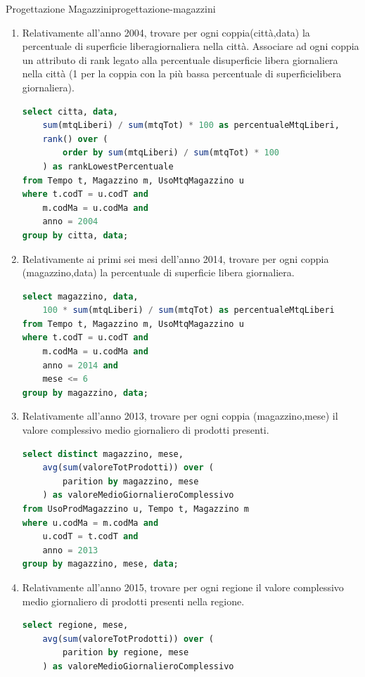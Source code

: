 \documentclass[12pt]{article}
\begin{document}
\begin{problem}{Progettazione Magazzini}{progettazione-magazzini}
\begin{enumerate}
\begin{lstlisting}[language=sql]
from UsoProdMagazzino u, Tempo t, Magazzino m
where u.codT = t.codT and
    u.codMa = m.codMa and
    citta = 'torino' and
    anno = 2013 and
    3m = 1
group by magazzino, data;
\end{lstlisting}
        \item Relativamente all’anno 2004, trovare per ogni coppia(città,data) la percentuale di superficie liberagiornaliera nella città. Associare ad ogni coppia un attributo di rank legato alla percentuale disuperficie libera giornaliera nella città (1 per la coppia con la più bassa percentuale di superficielibera giornaliera).
\begin{lstlisting}[language=sql]
select citta, data,
    sum(mtqLiberi) / sum(mtqTot) * 100 as percentualeMtqLiberi,
    rank() over (
        order by sum(mtqLiberi) / sum(mtqTot) * 100
    ) as rankLowestPercentuale
from Tempo t, Magazzino m, UsoMtqMagazzino u
where t.codT = u.codT and
    m.codMa = u.codMa and
    anno = 2004
group by citta, data;
\end{lstlisting}
        \item Relativamente ai primi sei mesi dell’anno 2014, trovare per ogni coppia (magazzino,data) la percentuale di superficie libera giornaliera.
\begin{lstlisting}[language=sql]
select magazzino, data,
    100 * sum(mtqLiberi) / sum(mtqTot) as percentualeMtqLiberi
from Tempo t, Magazzino m, UsoMtqMagazzino u
where t.codT = u.codT and
    m.codMa = u.codMa and
    anno = 2014 and
    mese <= 6
group by magazzino, data;
\end{lstlisting}
        \item Relativamente all’anno 2013, trovare per ogni coppia (magazzino,mese) il valore complessivo medio giornaliero di prodotti presenti.
\begin{lstlisting}[language=sql]
select distinct magazzino, mese,
    avg(sum(valoreTotProdotti)) over (
        parition by magazzino, mese
    ) as valoreMedioGiornalieroComplessivo
from UsoProdMagazzino u, Tempo t, Magazzino m
where u.codMa = m.codMa and
    u.codT = t.codT and
    anno = 2013
group by magazzino, mese, data;
\end{lstlisting}
        \item Relativamente all’anno 2015, trovare per ogni regione il valore complessivo medio giornaliero di prodotti presenti nella regione.
\begin{lstlisting}[language=sql]
select regione, mese,
    avg(sum(valoreTotProdotti)) over (
        parition by regione, mese
    ) as valoreMedioGiornalieroComplessivo

\end{lstlisting}
\end{enumerate}
\end{problem}
\end{document}
